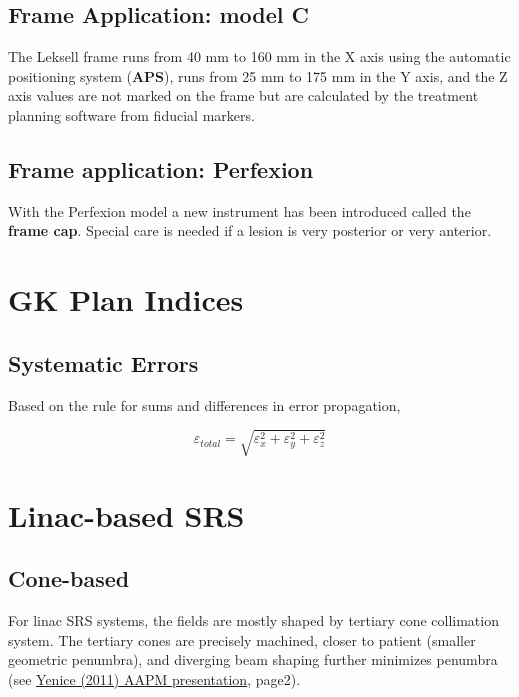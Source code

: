 \documentclass[]{book}
\theoremstyle{definition}
\theoremstyle{definition}
\theoremstyle{definition}
\theoremstyle{remark}
\begin{document}
\subsection{Frame Application: model C}\label{frame-application-model-c}

The Leksell frame runs from 40 mm to 160 mm in the X axis using the
automatic positioning system (\textbf{APS}), runs from 25 mm to 175 mm
in the Y axis, and the Z axis values are not marked on the frame but are
calculated by the treatment planning software from fiducial markers.

\subsection{Frame application:
Perfexion}\label{frame-application-perfexion}

With the Perfexion model a new instrument has been introduced called the
\textbf{frame cap}. Special care is needed if a lesion is very posterior
or very anterior.

\section{GK Plan Indices}\label{gk-plan-indices}

\subsection{Systematic Errors}\label{systematic-errors}

Based on the rule for sums and differences in error propagation,

\begin{equation*}
\varepsilon_{total}=\sqrt{\varepsilon_{x}^{2}+\varepsilon_{y}^{2}+\varepsilon_{z}^{2}}
\end{equation*}

\section{Linac-based SRS}\label{linac-based-srs}

\subsection{Cone-based}\label{cone-based}

For linac SRS systems, the fields are mostly shaped by tertiary cone
collimation system. The tertiary cones are precisely machined, closer to
patient (smaller geometric penumbra), and diverging beam shaping further
minimizes penumbra (see
\href{http://www.aapm.org/meetings/amos2/pdf/59-17160-8941-53.pdf}{Yenice
(2011) AAPM presentation}, page2).
\end{document}
